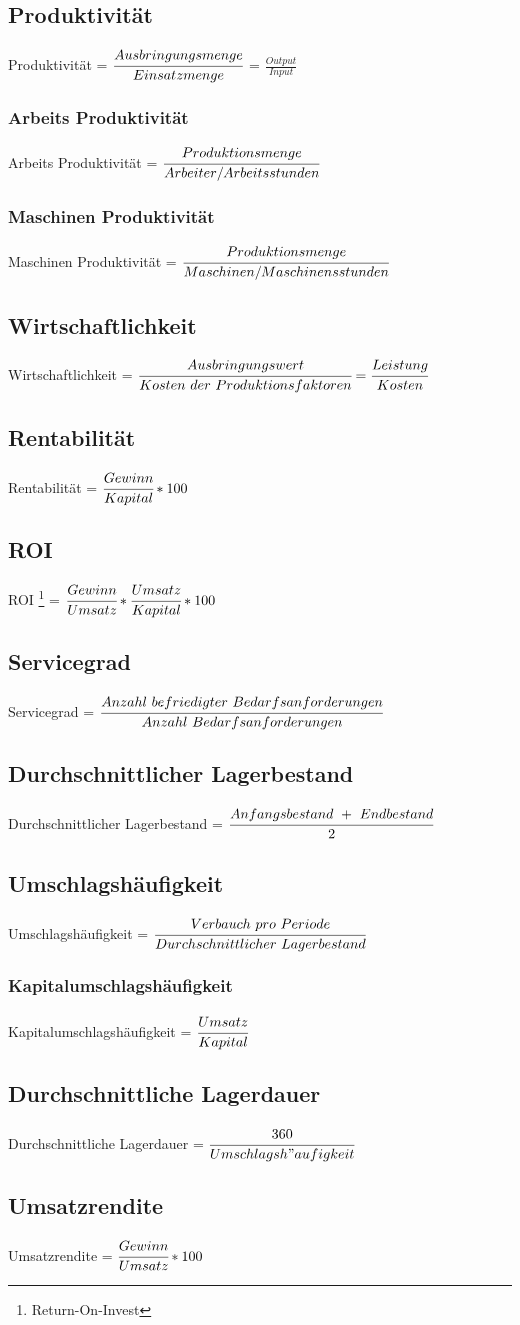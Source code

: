 \documentclass[a4paper,12pt]{scrartcl}
\begin{document}
\subsection{Produktivität}
Produktivität = $\cfrac{Ausbringungsmenge}{Einsatzmenge}$ = $\frac{Output}{Input}$ 
\subsubsection{Arbeits Produktivität}
Arbeits Produktivität = $\cfrac{Produktionsmenge}{Arbeiter/Arbeitsstunden}$
\subsubsection{Maschinen Produktivität}
Maschinen Produktivität = $\cfrac{Produktionsmenge}{Maschinen/Maschinensstunden}$

\subsection{Wirtschaftlichkeit}
Wirtschaftlichkeit = $\cfrac{Ausbringungswert}{Kosten~der~Produktionsfaktoren} = \cfrac{Leistung}{Kosten}$ 

\subsection{Rentabilität} 
Rentabilität = $\cfrac{Gewinn}{Kapital} * 100$ 

\subsection{ROI} 
ROI \footnote{Return-On-Invest} = $\cfrac{Gewinn}{Umsatz} * \cfrac{Umsatz}{Kapital} * 100$ 

\subsection{Servicegrad} 
Servicegrad = $\cfrac{Anzahl~befriedigter~Bedarfsanforderungen}{Anzahl~Bedarfsanforderungen}$ 

\subsection{Durchschnittlicher Lagerbestand} 
Durchschnittlicher Lagerbestand = $\cfrac{Anfangsbestand~+~Endbestand}{2}$ 

\subsection{Umschlagshäufigkeit}
Umschlagshäufigkeit = $\cfrac{Verbauch~pro~Periode}{Durchschnittlicher~Lagerbestand}$
\subsubsection{Kapitalumschlagshäufigkeit}
Kapitalumschlagshäufigkeit = $\cfrac{Umsatz}{Kapital}$

\subsection{Durchschnittliche Lagerdauer} 
Durchschnittliche Lagerdauer = $\cfrac{360}{Umschlagsh"aufigkeit}$ 

\subsection{Umsatzrendite} 
Umsatzrendite = $\cfrac{Gewinn}{Umsatz} * 100$ 
\end{document}
